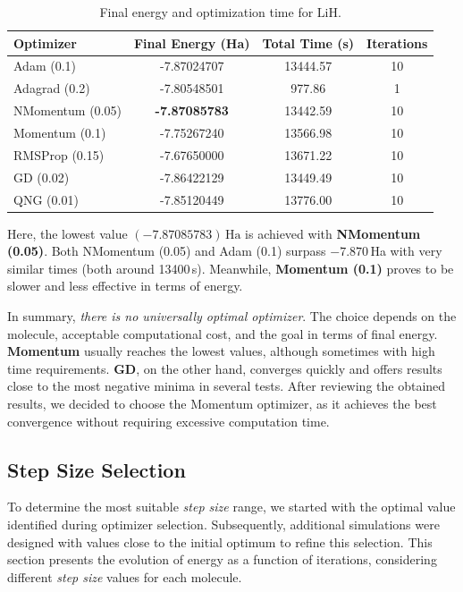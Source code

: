 \begin{table}[H]
\centering
\caption{Final energy and optimization time for \(\mathrm{LiH}\).}
\begin{tabular}{lccc}
\toprule
\textbf{Optimizer} & \textbf{Final Energy (Ha)} & \textbf{Total Time (s)} & \textbf{Iterations} \\
\midrule
Adam (0.1)       & -7.87024707 & 13444.57 & 10 \\
Adagrad (0.2)    & -7.80548501 & 977.86   &  1 \\
NMomentum (0.05) & \textbf{-7.87085783} & 13442.59 & 10 \\
Momentum (0.1)   & -7.75267240 & 13566.98 & 10 \\
RMSProp (0.15)   & -7.67650000 & 13671.22 & 10 \\
GD (0.02)        & -7.86422129 & 13449.49 & 10 \\
QNG (0.01)       & -7.85120449 & 13776.00 & 10 \\
\bottomrule
\end{tabular}
\end{table}

Here, the lowest value \((-7.87085783)\,\mathrm{Ha}\) is achieved with \textbf{NMomentum (0.05)}. Both NMomentum (0.05) and Adam (0.1) surpass \(-7.870\)\,Ha with very similar times (both around 13400\,s). Meanwhile, \textbf{Momentum (0.1)} proves to be slower and less effective in terms of energy.

In summary, \emph{there is no universally optimal optimizer}. The choice depends on the molecule, acceptable computational cost, and the goal in terms of final energy. \textbf{Momentum} usually reaches the lowest values, although sometimes with high time requirements. \textbf{GD}, on the other hand, converges quickly and offers results close to the most negative minima in several tests. After reviewing the obtained results, we decided to choose the Momentum optimizer, as it achieves the best convergence without requiring excessive computation time.

\subsection{Step Size Selection}
To determine the most suitable \textit{step size} range, we started with the optimal value identified during optimizer selection. Subsequently, additional simulations were designed with values close to the initial optimum to refine this selection. This section presents the evolution of energy as a function of iterations, considering different \textit{step size} values for each molecule.

